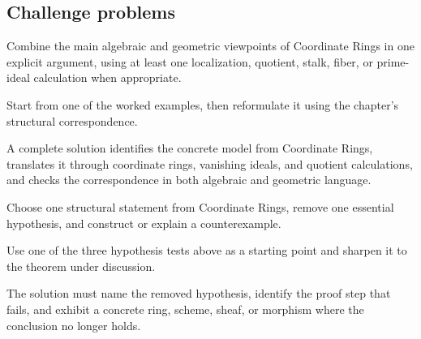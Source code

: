 \subsection*{Challenge problems}

\begin{exercise}\label{exr:vi03-expand-15}
Combine the main algebraic and geometric viewpoints of Coordinate Rings in one explicit argument, using at least one localization, quotient, stalk, fiber, or prime-ideal calculation when appropriate.
\end{exercise}
\begin{hint}
Start from one of the worked examples, then reformulate it using the chapter's structural correspondence.
\end{hint}
\begin{solution}
A complete solution identifies the concrete model from Coordinate Rings, translates it through coordinate rings, vanishing ideals, and quotient calculations, and checks the correspondence in both algebraic and geometric language.
\end{solution}

\begin{exercise}\label{exr:vi03-expand-16}
Choose one structural statement from Coordinate Rings, remove one essential hypothesis, and construct or explain a counterexample.
\end{exercise}
\begin{hint}
Use one of the three hypothesis tests above as a starting point and sharpen it to the theorem under discussion.
\end{hint}
\begin{solution}
The solution must name the removed hypothesis, identify the proof step that fails, and exhibit a concrete ring, scheme, sheaf, or morphism where the conclusion no longer holds.
\end{solution}

